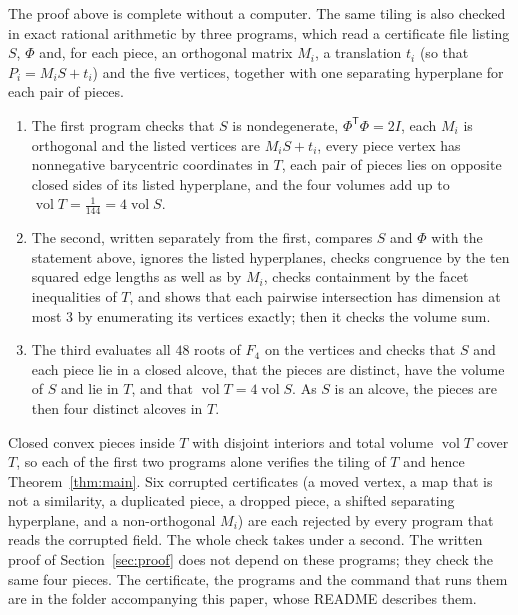 \documentclass[11pt]{article}
\theoremstyle{remark}
\begin{document}
The proof above is complete without a computer. The same tiling is also
checked in exact rational arithmetic by three programs, which read a
certificate file listing $S$, $\Phi$ and, for each piece, an orthogonal
matrix $M_i$, a translation $t_i$ (so that $P_i=M_iS+t_i$) and the five
vertices, together with one separating hyperplane for each pair of
pieces.
\begin{enumerate}
\item The first program checks that $S$ is nondegenerate,
  $\Phi^{\mathsf T}\Phi=2I$, each $M_i$ is orthogonal and the listed vertices
  are $M_iS+t_i$, every piece vertex has nonnegative barycentric
  coordinates in $T$, each pair of pieces lies on opposite closed sides
  of its listed hyperplane, and the four volumes add up to
  $\operatorname{vol}T=\frac1{144}=4\operatorname{vol}S$.
\item The second, written separately from the first, compares $S$ and
  $\Phi$ with the statement above, ignores the listed hyperplanes, checks
  congruence by the ten squared edge lengths as well as by $M_i$, checks
  containment by the facet inequalities of $T$, and shows that each
  pairwise intersection has dimension at most $3$ by enumerating its
  vertices exactly; then it checks the volume sum.
\item The third evaluates all $48$ roots of $F_4$ on the vertices and
  checks that $S$ and each piece lie in a closed alcove, that the pieces
  are distinct, have the volume of $S$ and lie in $T$, and that
  $\operatorname{vol}T=4\operatorname{vol}S$. As $S$ is an alcove, the
  pieces are then four distinct alcoves in $T$.
\end{enumerate}
Closed convex pieces inside $T$ with disjoint interiors and total volume
$\operatorname{vol}T$ cover $T$, so each of the first two programs alone
verifies the tiling of $T$ and hence Theorem~\ref{thm:main}. Six
corrupted certificates (a moved vertex, a map that is not a similarity,
a duplicated piece, a dropped piece, a shifted separating hyperplane, and
a non-orthogonal $M_i$) are each rejected by every program that reads the
corrupted field. The whole check takes under a second. The written proof
of Section~\ref{sec:proof} does not depend on these programs; they check
the same four pieces. The certificate, the programs and the command that runs them are
in the folder accompanying this paper, whose README describes them.
\end{document}
